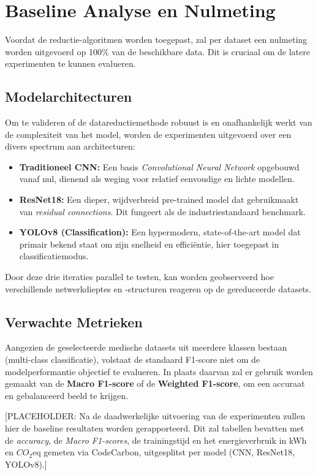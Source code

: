 \section{Baseline Analyse en Nulmeting}
\label{sec:baseline}
Voordat de reductie-algoritmen worden toegepast, zal per dataset een nulmeting worden uitgevoerd op 100\% van de beschikbare data. Dit is cruciaal om de latere experimenten te kunnen evalueren.

\subsection{Modelarchitecturen}
Om te valideren of de datareductiemethode robuust is en onafhankelijk werkt van de complexiteit van het model, worden de experimenten uitgevoerd over een divers spectrum aan architecturen:
\begin{itemize}
    \item \textbf{Traditioneel CNN:} Een basis \textit{Convolutional Neural Network} opgebouwd vanaf nul, dienend als weging voor relatief eenvoudige en lichte modellen.
    \item \textbf{ResNet18:} Een dieper, wijdverbreid pre-trained model dat gebruikmaakt van \textit{residual connections}. Dit fungeert als de industriestandaard benchmark.
    \item \textbf{YOLOv8 (Classification):} Een hypermodern, state-of-the-art model dat primair bekend staat om zijn snelheid en efficiëntie, hier toegepast in classificatiemodus.
\end{itemize}
Door deze drie iteraties parallel te testen, kan worden geobserveerd hoe verschillende netwerkdieptes en -structuren reageren op de gereduceerde datasets.

\subsection{Verwachte Metrieken}
Aangezien de geselecteerde medische datasets uit meerdere klassen bestaan (multi-class classificatie), volstaat de standaard F1-score niet om de modelperformantie objectief te evalueren. In plaats daarvan zal er gebruik worden gemaakt van de \textbf{Macro F1-score} of de \textbf{Weighted F1-score}, om een accuraat en gebalanceerd beeld te krijgen.

[PLACEHOLDER: Na de daadwerkelijke uitvoering van de experimenten zullen hier de baseline resultaten worden gerapporteerd. Dit zal tabellen bevatten met de \textit{accuracy}, de \textit{Macro F1-scores}, de trainingstijd en het energieverbruik in kWh en $CO_2$eq gemeten via CodeCarbon, uitgesplitst per model (CNN, ResNet18, YOLOv8).]


